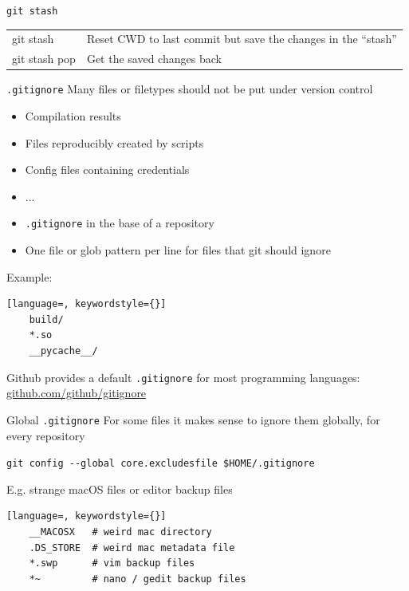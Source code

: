 \begin{frame}{\texttt{git stash}}
  \begin{tabu}{>{\ttfamily}l X[,L]}
    git stash     & Reset CWD to last commit but save the changes in the \enquote{stash} \\
    git stash pop & Get the saved changes back
  \end{tabu}
\end{frame}

\begin{frame}[fragile]{\texttt{.gitignore}}
  Many files or filetypes should not be put under version control
  \begin{itemize}
    \item Compilation results
    \item Files reproducibly created by scripts
    \item Config files containing credentials
    \item ...
  \end{itemize}

  \begin{itemize}
  \item \texttt{.gitignore} in the base of a repository
  \item One file or glob pattern per line for files that git should ignore
  \end{itemize}
  Example:
  \begin{lstlisting}[language=, keywordstyle={}]
    build/
    *.so
    __pycache__/
  \end{lstlisting}

  Github provides a default \texttt{.gitignore} for most programming languages: \href{https://github.com/github/gitignore}{github.com/github/gitignore}
\end{frame}

\begin{frame}[fragile]{Global \texttt{.gitignore}}
  For some files it makes sense to ignore them globally, for every repository

  \lstinline+git config --global core.excludesfile $HOME/.gitignore+

  E.g. strange macOS files or editor backup files

  \begin{lstlisting}[language=, keywordstyle={}]
    __MACOSX   # weird mac directory
    .DS_STORE  # weird mac metadata file
    *.swp      # vim backup files
    *~         # nano / gedit backup files
  \end{lstlisting}

\end{frame}


